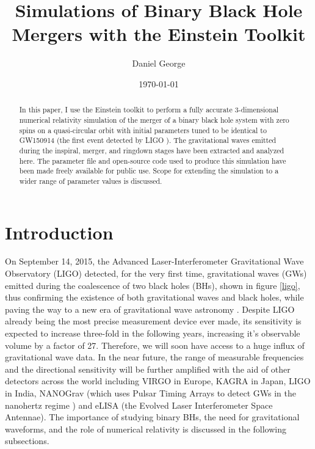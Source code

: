 \documentclass[aps,twocolumn,secnumarabic,nobalancelastpage,amsmath,amssymb,
nofootinbib]{revtex4}
\begin{document}
	\title{Simulations of Binary Black Hole Mergers with the Einstein Toolkit}
	\author         {Daniel George}
	\date{\today}
	
	\begin{abstract}
	In this paper, I use the Einstein toolkit to perform a fully accurate 3-dimensional numerical relativity simulation of the merger of a binary black hole system with zero spins on a quasi-circular orbit with initial parameters tuned to be identical to GW150914 (the first event detected by LIGO \cite{gw1}). The gravitational waves emitted during the inspiral, merger, and ringdown stages have been extracted and analyzed here. The parameter file and open-source code used to produce this simulation have been made freely available for public use. Scope for extending the simulation to a wider range of parameter values is discussed.
	\end{abstract}
	
	\maketitle
	

	\section{Introduction}
	On September 14, 2015, the Advanced Laser-Interferometer Gravitational Wave Observatory (LIGO) detected, for the very first time, gravitational waves (GWs) emitted during the coalescence of two black holes (BHs), shown in figure \ref{ligo}, thus confirming the existence of both gravitational waves and black holes, while paving the way to a new era of gravitational wave astronomy \cite{gw1}. Despite LIGO already being the most precise measurement device ever made, its sensitivity is expected to increase three-fold in the following years, increasing it's observable volume by a factor of 27. Therefore, we will soon have access to a huge influx of gravitational wave data. In the near future, the range of measurable frequencies and the directional sensitivity will be further amplified with the aid of other detectors across the world including VIRGO in Europe, KAGRA in Japan, LIGO in India, NANOGrav (which uses Pulsar Timing Arrays to detect GWs in the nanohertz regime \cite{nano}) and eLISA (the Evolved Laser Interferometer Space Antennae).  The importance of studying binary BHs, the need for gravitational waveforms, and the role of numerical relativity is discussed in the following subsections.
\end{document}
